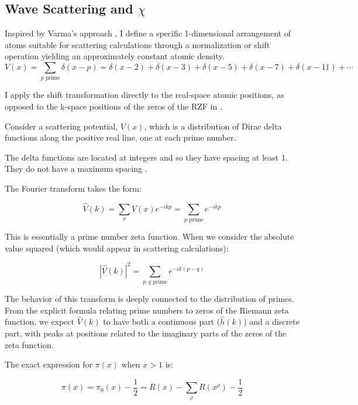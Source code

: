 \documentclass[11pt, oneside]{article}
\begin{document}
\subsection{Wave Scattering and $\chi$}
Inspired by Varma's approach \cite{Varma2016}, I define a specific 1-dimensional arrangement of atoms suitable for scattering calculations through a normalization or shift operation yielding an approximately constant atomic density.
\begin{equation}
V(x) = \sum_{p \text{ prime}} \delta(x - p) = \delta(x - 2) + \delta(x - 3) + \delta(x - 5) + \delta(x - 7) + \delta(x - 11) + \cdots
\end{equation}

I apply the shift transformation directly to the real-space atomic positions, as opposed to the k-space positions of the zeros of the RZF in \cite{Varma2016}.

Consider a scattering potential, $V(x)$, which is a distribution of Dirac delta functions along the positive real line, one at each prime number.

The delta functions are located at integers and so they have spacing at least 1. They do not have a maximum spacing \cite{Westzynthius1931, Erdos1950}.

The Fourier transform takes the form:

\begin{equation}
\hat{V}(k) = \sum_{x} V(x) e^{-ikp} =  \sum_{p \text{ prime}} e^{-ikp}
\end{equation}

This is essentially a prime number zeta function. When we consider the absolute value squared (which would appear in scattering calculations):

\begin{equation}
|\hat{V}(k)|^2 = \sum_{p,q \text{ prime}} e^{-ik(p-q)}
\end{equation}

The behavior of this transform is deeply connected to the distribution of primes. From the explicit formula relating prime numbers to zeros of the Riemann zeta function, we expect $\hat{V}(k)$ to have both a continuous part ($\hat{h}(k)$) and a discrete part, with peaks at positions related to the imaginary parts of the zeros of the zeta function.

The exact expression \cite{Riemann1859} for $\pi(x)$ when $x>1$ is:

\begin{equation}
\pi(x) = \pi_0(x) - \frac{1}{2} = R(x) - \sum_{\rho}R(x^{\rho}) - \frac{1}{2}
\end{equation}
\end{document}
